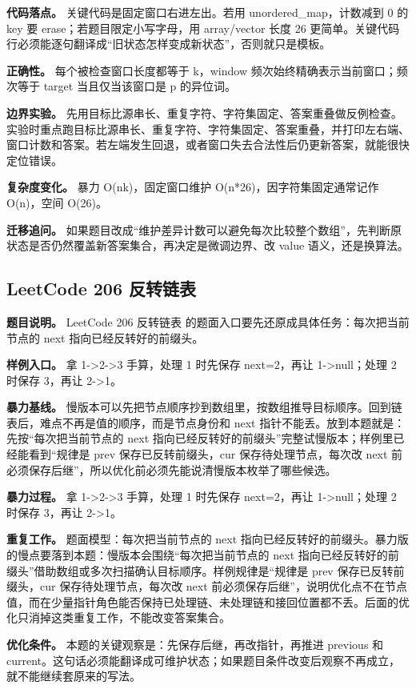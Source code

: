 \textbf{代码落点。} 关键代码是固定窗口右进左出。若用 unordered\_map，计数减到 0 的 key 要 erase；若题目限定小写字母，用 array/vector 长度 26 更简单。关键代码行必须能逐句翻译成“旧状态怎样变成新状态”，否则就只是模板。

\textbf{正确性。} 每个被检查窗口长度都等于 k，window 频次始终精确表示当前窗口；频次等于 target 当且仅当该窗口是 p 的异位词。

\textbf{边界实验。} 先用目标比源串长、重复字符、字符集固定、答案重叠做反例检查。实验时重点跑目标比源串长、重复字符、字符集固定、答案重叠，并打印左右端、窗口计数和答案。若左端发生回退，或者窗口失去合法性后仍更新答案，就能很快定位错误。

\textbf{复杂度变化。} 暴力 O(nk)，固定窗口维护 O(n*26)，因字符集固定通常记作 O(n)，空间 O(26)。

\textbf{迁移追问。} 如果题目改成“维护差异计数可以避免每次比较整个数组”，先判断原状态是否仍然覆盖新答案集合，再决定是微调边界、改 value 语义，还是换算法。

\subsection{LeetCode 206 反转链表}

\textbf{题目说明。} LeetCode 206 反转链表 的题面入口要先还原成具体任务：每次把当前节点的 next 指向已经反转好的前缀头。

\textbf{样例入口。} 拿 1->2->3 手算，处理 1 时先保存 next=2，再让 1->null；处理 2 时保存 3，再让 2->1。

\textbf{暴力基线。} 慢版本可以先把节点顺序抄到数组里，按数组推导目标顺序。回到链表后，难点不再是值的顺序，而是节点身份和 next 指针不能丢。放到本题就是：先按“每次把当前节点的 next 指向已经反转好的前缀头”完整试慢版本；样例里已经能看到“规律是 prev 保存已反转前缀头，cur 保存待处理节点，每次改 next 前必须保存后继”，所以优化前必须先能说清慢版本枚举了哪些候选。

\textbf{暴力过程。} 拿 1->2->3 手算，处理 1 时先保存 next=2，再让 1->null；处理 2 时保存 3，再让 2->1。

\textbf{重复工作。} 题面模型：每次把当前节点的 next 指向已经反转好的前缀头。暴力版的慢点要落到本题：慢版本会围绕“每次把当前节点的 next 指向已经反转好的前缀头”借助数组或多次扫描确认目标顺序。样例规律是“规律是 prev 保存已反转前缀头，cur 保存待处理节点，每次改 next 前必须保存后继”，说明优化点不在节点值，而在少量指针角色能否保持已处理链、未处理链和接回位置都不丢。后面的优化只消掉这类重复工作，不能改变答案集合。

\textbf{优化条件。} 本题的关键观察是：先保存后继，再改指针，再推进 previous 和 current。这句话必须能翻译成可维护状态；如果题目条件改变后观察不再成立，就不能继续套原来的写法。


